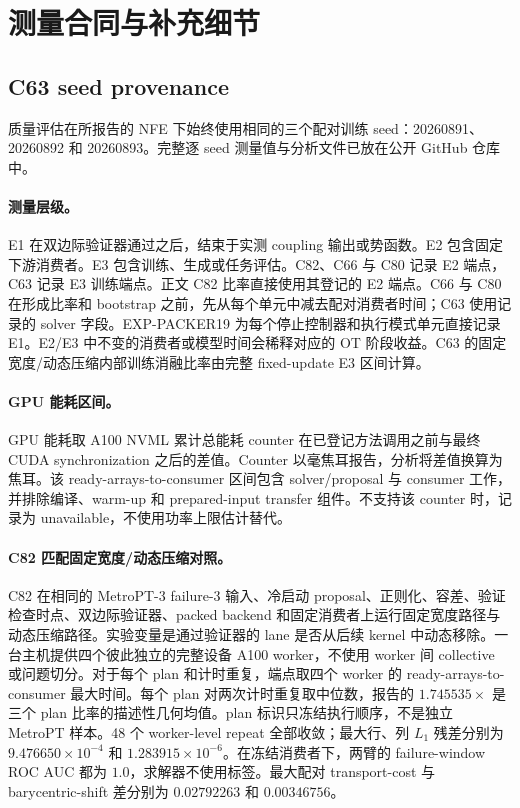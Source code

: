 \section{测量合同与补充细节}

\subsection{C63 seed provenance}
质量评估在所报告的 NFE 下始终使用相同的三个配对训练 seed：20260891、20260892 和 20260893。完整逐 seed 测量值与分析文件已放在公开 GitHub 仓库中。

\paragraph{测量层级。}
E1 在双边际验证器通过之后，结束于实测 coupling 输出或势函数。E2 包含固定下游消费者。E3 包含训练、生成或任务评估。C82、C66 与 C80 记录 E2 端点，C63 记录 E3 训练端点。正文 C82 比率直接使用其登记的 E2 端点。C66 与 C80 在形成比率和 bootstrap 之前，先从每个单元中减去配对消费者时间；C63 使用记录的 solver 字段。EXP-PACKER19 为每个停止控制器和执行模式单元直接记录 E1。E2/E3 中不变的消费者或模型时间会稀释对应的 OT 阶段收益。C63 的固定宽度/动态压缩内部训练消融比率由完整 fixed-update E3 区间计算。

\paragraph{GPU 能耗区间。}
GPU 能耗取 A100 NVML 累计总能耗 counter 在已登记方法调用之前与最终 CUDA synchronization 之后的差值。Counter 以毫焦耳报告，分析将差值换算为焦耳。该 ready-arrays-to-consumer 区间包含 solver/proposal 与 consumer 工作，并排除编译、warm-up 和 prepared-input transfer 组件。不支持该 counter 时，记录为 unavailable，不使用功率上限估计替代。

\paragraph{C82 匹配固定宽度/动态压缩对照。}
C82 在相同的 MetroPT-3 failure-3 输入、冷启动 proposal、正则化、容差、验证检查时点、双边际验证器、packed backend 和固定消费者上运行固定宽度路径与动态压缩路径。实验变量是通过验证器的 lane 是否从后续 kernel 中动态移除。一台主机提供四个彼此独立的完整设备 A100 worker，不使用 worker 间 collective 或问题切分。对于每个 plan 和计时重复，端点取四个 worker 的 ready-arrays-to-consumer 最大时间。每个 plan 对两次计时重复取中位数，报告的 $1.745535\times$ 是三个 plan 比率的描述性几何均值。plan 标识只冻结执行顺序，不是独立 MetroPT 样本。48 个 worker-level repeat 全部收敛；最大行、列 $L_1$ 残差分别为 $9.476650\times10^{-4}$ 和 $1.283915\times10^{-6}$。在冻结消费者下，两臂的 failure-window ROC AUC 都为 $1.0$，求解器不使用标签。最大配对 transport-cost 与 barycentric-shift 差分别为 $0.02792263$ 和 $0.00346756$。

